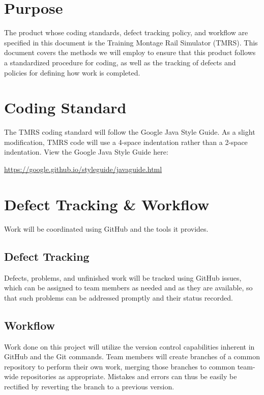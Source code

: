\documentclass{scrreprt}
\begin{document}
\section{Purpose}
The product whose coding standards, defect tracking policy, and workflow are specified in this document is the Training Montage Rail Simulator (TMRS). This document covers the methods we will employ to ensure that this product follows a standardized procedure for coding, as well as the tracking of defects and policies for defining how work is completed.

\section{Coding Standard}
The TMRS coding standard will follow the Google Java Style Guide. As a slight modification, TMRS code will use a 4-space indentation rather than a 2-space indentation. View the Google Java Style Guide here:

\url{https://google.github.io/styleguide/javaguide.html}

\section{Defect Tracking \& Workflow}
Work will be coordinated using GitHub and the tools it provides.

\subsection{Defect Tracking}
Defects, problems, and unfinished work will be tracked using GitHub issues, which can be assigned to team members as needed and as they are available, so that such problems can be addressed promptly and their status recorded.

\subsection{Workflow}
Work done on this project will utilize the version control capabilities inherent in GitHub and the Git commands.  Team members will create branches of a common repository to perform their own work, merging those branches to common team-wide repositories as appropriate.  Mistakes and errors can thus be easily be rectified by reverting the branch to a previous version.
\end{document}
